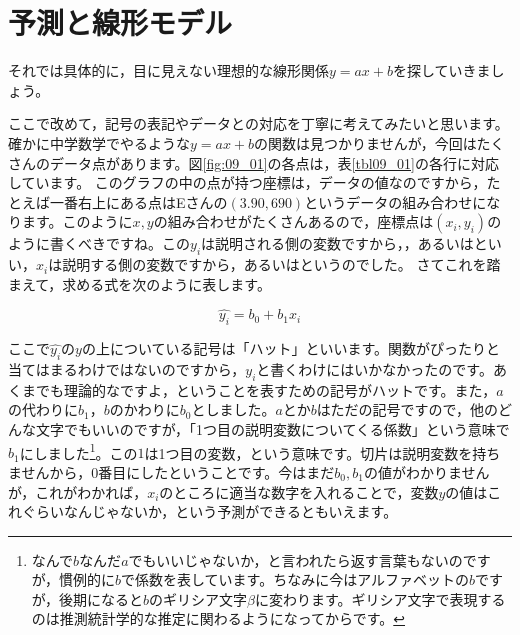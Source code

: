 \documentclass{ltjbook}
\begin{document}
\section{予測と線形モデル}

それでは具体的に，目に見えない理想的な線形関係$y=ax+b$を探していきましょう。

ここで改めて，記号の表記やデータとの対応を丁寧に考えてみたいと思います。確かに中学数学でやるような$y=ax+b$の関数は見つかりませんが，今回はたくさんのデータ点があります。図\ref{fig:09_01}の各点は，表\ref{tbl09_01}の各行に対応しています。
このグラフの中の点が持つ座標は，データの値なのですから，たとえば一番右上にある点はEさんの$(3.90,690)$というデータの組み合わせになります。このように$x,y$の組み合わせがたくさんあるので，座標点は$(x_i,y_i)$のように書くべきですね。この$y_i$は説明される側の変数ですから，，あるいはといい，$x_i$は説明する側の変数ですから，あるいはというのでした。
さてこれを踏まえて，求める式を次のように表します。

\[ \hat{y_i} = b_0 + b_1 x_i \]

ここで$\hat{y_i}$の$y$の上についている記号は「ハット」といいます。関数がぴったりと当てはまるわけではないのですから，$y_i$と書くわけにはいかなかったのです。あくまでも理論的なですよ，ということを表すための記号がハットです。また，$a$の代わりに$b_1$，$b$のかわりに$b_0$としました。$a$とか$b$はただの記号ですので，他のどんな文字でもいいのですが，「1つ目の説明変数についてくる係数」という意味で$b_1$にしました\footnote{なんで$b$なんだ$a$でもいいじゃないか，と言われたら返す言葉もないのですが，慣例的に$b$で係数を表しています。ちなみに今はアルファベットの$b$ですが，後期になると$b$のギリシア文字$\beta$に変わります。ギリシア文字で表現するのは推測統計学的な推定に関わるようになってからです。}。この$1$は1つ目の変数，という意味です。切片は説明変数を持ちませんから，0番目にしたということです。今はまだ$b_0, b_1$の値がわかりませんが，これがわかれば，$x_i$のところに適当な数字を入れることで，変数$y$の値はこれぐらいなんじゃないか，という予測ができるともいえます。
\end{document}
